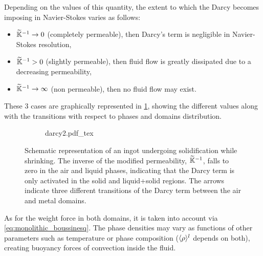 Depending on the values of this quantity, the extent to which the Darcy becomes imposing in Navier-Stokes varies as follows:
\begin{itemize}
\itemsep0em
\item $\widetilde{\mathbb{K}}^{-1} \rightarrow 0$ (completely permeable), then Darcy's term is negligible in Navier-Stokes resolution,
\item $\widetilde{\mathbb{K}}^{-1} > 0$ (slightly permeable), then fluid flow is greatly dissipated due to a decreasing permeability,
\item $\widetilde{\mathbb{K}}^{-1} \rightarrow \infty$ (non permeable), then no fluid flow may exist.
\end{itemize}
These 3 cases are graphically represented in \cref{fig:darcy_modif}, showing the different values along with the transitions 
with respect to phases and domains distribution. 

\begin{figure}[htbp]
\centering
  \begin{subfigure}{1.0\textwidth}
    \centering
    \def\svgwidth{250pt}
	{darcy2.pdf_tex}
  \end{subfigure}
\caption{Schematic representation of an ingot undergoing solidification while shrinking. 
The inverse of the modified permeability, $\widetilde{\mathbb{K}}^{-1}$, falls to zero in the air and liquid phases,
indicating that the Darcy term is only activated in the solid and liquid+solid regions.
The arrows indicate three different transitions of the Darcy term between the air and metal domains.}
\label{fig:darcy_modif}
\end{figure}

As for the weight force in both domains, it is taken into account via \cref{eq:monolithic_boussinesq}. 
The phase densities may vary as functions of other parameters such
as temperature or phase composition ($\langle \rho \rangle^l$ depends on both), creating buoyancy forces of convection inside the fluid.

